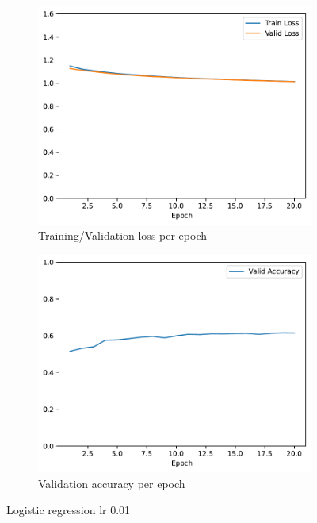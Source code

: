 \documentclass[11pt]{article}
\begin{document}
\begin{figure}
\centering
\begin{subfigure}{.5\textwidth}
  \centering
  \includegraphics[width=.9\linewidth]{plots/logistic_regression-training-loss-batch-16-lr-0.001-epochs-20-l2-0-opt-sgd}
  \caption{Training/Validation loss per epoch}
\end{subfigure}%
\begin{subfigure}{.5\textwidth}
  \centering
  \includegraphics[width=.9\linewidth]{plots/logistic_regression-validation-accuracy-batch-16-lr-0.001-epochs-20-l2-0-opt-sgd}
  \caption{Validation accuracy per epoch}
\end{subfigure}
\caption{Logistic regression lr 0.01}
\label{fig:regression_lr_0.001}
\end{figure}
\end{document}
